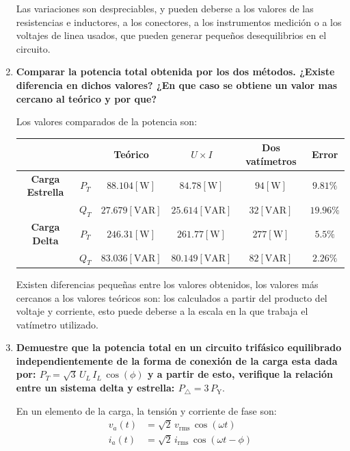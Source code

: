\documentclass[letter,11pt]{article}
\begin{document}
\begin{enumerate}
Las variaciones son despreciables, y pueden deberse a los valores de las
resistencias e inductores, a los conectores, a los instrumentos medición o
a los voltajes de linea usados, que pueden generar pequeños desequilibrios en
el circuito.

\item \textbf{Comparar la potencia total obtenida por los dos métodos. ¿Existe
diferencia en dichos valores? ¿En que caso se obtiene un valor mas cercano al
teórico y por que?}

Los valores comparados de la potencia son:

\begin{center}
    \begin{tabular}{|c|c||c||c|c||c|}
    \hline
    \multicolumn{2}{|c||}{} &
    \textbf{Teórico} & $U{\times}I$ & \textbf{Dos vatímetros} & \textbf{Error}
    \tabularnewline \hline \hline
    \textbf{Carga Estrella} & $P_T$ &
    $88.104[\text{W}]$ & $84.78[\text{W}]$ & $94[\text{W}]$ & $9.81\%$
    \tabularnewline \hline
                   & $Q_T$ &
    $27.679[\text{VAR}]$ & $25.614[\text{VAR}]$ & $32[\text{VAR}]$ & $19.96\%$
    \tabularnewline \hline \hline
    \textbf{Carga Delta} & $P_T$ &
    $246.31[\text{W}]$ & $261.77[\text{W}]$ & $277[\text{W}]$ & $5.5\%$
    \tabularnewline \hline
                & $Q_T$ &
    $83.036[\text{VAR}]$ & $80.149[\text{VAR}]$ & $82[\text{VAR}]$ & $2.26\%$
    \tabularnewline \hline
    \end{tabular}
\end{center}

Existen diferencias pequeñas entre los valores obtenidos, los valores más
cercanos a los valores teóricos son: los calculados a partir del producto del
voltaje y corriente, esto puede deberse a la escala en la que trabaja el
vatímetro utilizado.

\item \textbf{Demuestre que la potencia total en un circuito trifásico
equilibrado independientemente de la forma de conexión de la carga esta dada
por: $P_T = \sqrt{3}\,U_L\,I_L\,\cos(\phi)$ y a partir de esto, verifique la
relación entre un sistema delta y estrella: $P_{\triangle} = 3\,P_{\text{Y}}$}.

En un elemento de la carga, la tensión y corriente de fase son:
\begin{equation*}
    \begin{split}
        v_a(t) &= \sqrt{2}\,v_{\text{rms}}\,\cos(\omega{t})\\
        i_a(t) &= \sqrt{2}\,i_{\text{rms}}\,\cos(\omega{t} - \phi)\\
    \end{split}
\end{equation*}



\end{enumerate}
\end{document}
